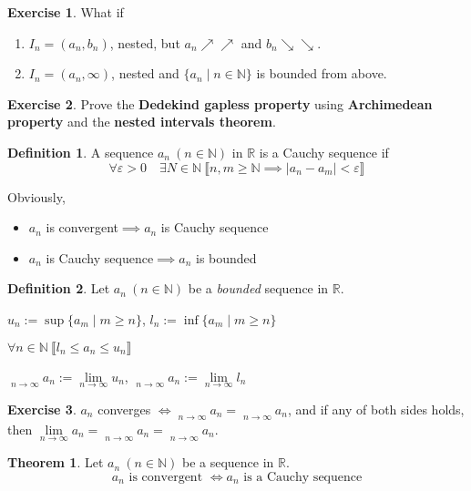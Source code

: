 \documentclass{article}
\theoremstyle{definition}
\newtheorem{theorem}{Theorem}
\newtheorem{definition}{Definition}
\newtheorem{exercise}{Exercise}
\begin{document}
\begin{exercise}
    What if 

    \begin{enumerate}
        \item $I_n=(a_n, b_n)$, nested, but $a_n\nearrow\nearrow$ and $b_n\searrow\searrow$.
        \item $I_n=(a_n, \infty)$, nested and $\{a_n\mid n\in \mathbb{N}\}$ is bounded from above.
    \end{enumerate}
\end{exercise}

\begin{exercise}
    Prove the \textbf{Dedekind gapless property} using \textbf{Archimedean property} and the \textbf{nested intervals theorem}.
\end{exercise}

\begin{definition}
    A sequence $a_n\ (n\in \mathbb{N})$ in $\mathbb{R}$ is a Cauchy sequence if 
    $$\forall \varepsilon > 0 \quad \exists N\in \mathbb{N}\ \llbracket n, m\geq\mathbb{N}\implies|a_n-a_m|<\varepsilon\rrbracket$$
\end{definition}

Obviously, 
\begin{itemize}
    \item $a_n$ is convergent$\implies a_n$ is Cauchy sequence
    \item $a_n$ is Cauchy sequence$\implies a_n$ is bounded
\end{itemize}

\begin{definition}
    Let $a_n\ (n\in \mathbb{N})$ be a \emph{bounded} sequence in $\mathbb{R}$.

    $u_n:=\sup\{a_m\mid m \geq n\}$, $l_n:=\inf\{a_m\mid m \geq n\}$
    
    $\forall n\in \mathbb{N}\ \llbracket l_n\leq a_n \leq u_n\rrbracket$

    $\mathop{\overline{\lim}}\limits_{n\to \infty} a_n:=\lim\limits_{n\to \infty} u_n$, $\mathop{\underline{\lim}}\limits_{n\to \infty} a_n:=\lim\limits_{n\to \infty} l_n$
\end{definition}

\begin{exercise}
    $a_n$ converges $\iff \mathop{\overline{\lim}}\limits_{n\to \infty} a_n = \mathop{\underline{\lim}}\limits_{n\to \infty} a_n$, and if any of both sides holds, then $\lim\limits_{n\to \infty} a_n = \mathop{\overline{\lim}}\limits_{n\to \infty} a_n = \mathop{\underline{\lim}}\limits_{n\to \infty} a_n$.
\end{exercise}

\begin{theorem}
    Let $a_n\ (n\in \mathbb{N})$ be a sequence in $\mathbb{R}$.
    $$a_n\text{ is convergent }\iff a_n\text{ is a Cauchy sequence}$$
\end{theorem}
\end{document}
